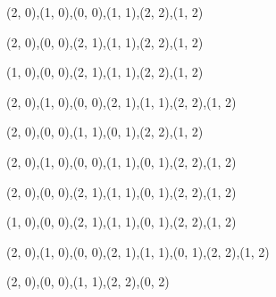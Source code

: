 \begin{figure}[H]
  \begin{subfigure}[b]{0.13\textwidth}
    \resizebox{\linewidth}{!} {
       {{(2, 0),(1, 0),(0, 0),(1, 1),(2, 2),(1, 2)}} {{}}
    }
  \end{subfigure}
  \begin{subfigure}[b]{0.13\textwidth}
    \resizebox{\linewidth}{!} {
       {{(2, 0),(0, 0),(2, 1),(1, 1),(2, 2),(1, 2)}} {{}}
    }
  \end{subfigure}
  \begin{subfigure}[b]{0.13\textwidth}
    \resizebox{\linewidth}{!} {
       {{(1, 0),(0, 0),(2, 1),(1, 1),(2, 2),(1, 2)}} {{}}
    }
  \end{subfigure}
  \begin{subfigure}[b]{0.13\textwidth}
    \resizebox{\linewidth}{!} {
       {{(2, 0),(1, 0),(0, 0),(2, 1),(1, 1),(2, 2),(1, 2)}} {{}}
    }
  \end{subfigure}
  \begin{subfigure}[b]{0.13\textwidth}
    \resizebox{\linewidth}{!} {
       {{(2, 0),(0, 0),(1, 1),(0, 1),(2, 2),(1, 2)}} {{}}
    }
  \end{subfigure}
  \begin{subfigure}[b]{0.13\textwidth}
    \resizebox{\linewidth}{!} {
       {{(2, 0),(1, 0),(0, 0),(1, 1),(0, 1),(2, 2),(1, 2)}} {{}}
    }
  \end{subfigure}
  \begin{subfigure}[b]{0.13\textwidth}
    \resizebox{\linewidth}{!} {
       {{(2, 0),(0, 0),(2, 1),(1, 1),(0, 1),(2, 2),(1, 2)}} {{}}
    }
  \end{subfigure}
  \begin{subfigure}[b]{0.13\textwidth}
    \resizebox{\linewidth}{!} {
       {{(1, 0),(0, 0),(2, 1),(1, 1),(0, 1),(2, 2),(1, 2)}} {{}}
    }
  \end{subfigure}
  \begin{subfigure}[b]{0.13\textwidth}
    \resizebox{\linewidth}{!} {
       {{(2, 0),(1, 0),(0, 0),(2, 1),(1, 1),(0, 1),(2, 2),(1, 2)}} {{}}
    }
  \end{subfigure}
  \begin{subfigure}[b]{0.13\textwidth}
    \resizebox{\linewidth}{!} {
       {{(2, 0),(0, 0),(1, 1),(2, 2),(0, 2)}} {{}}
    }
  \end{subfigure}
  \begin{subfigure}[b]{0.13\textwidth}

\end{subfigure}
\end{figure}
